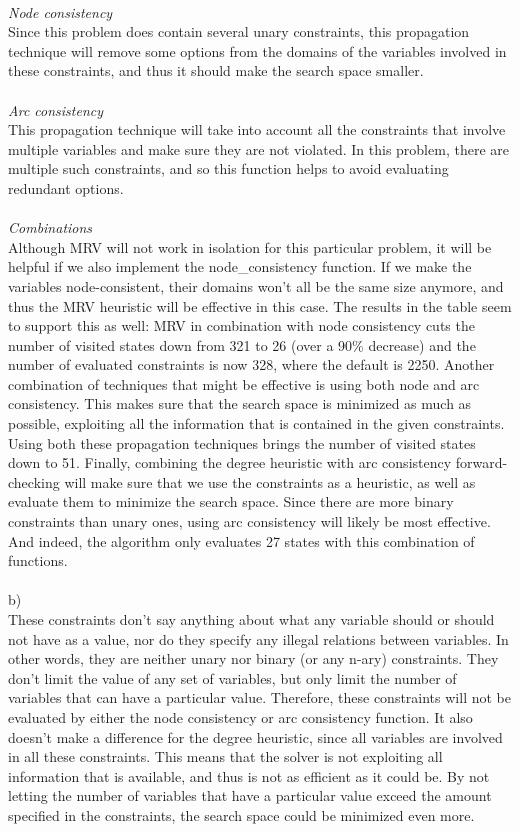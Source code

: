 \documentclass{article}
\begin{document}
\\
\textit{Node consistency}\\
Since this problem does contain several unary constraints, this propagation technique will remove some options from the domains of the variables involved in these constraints, and thus it should make the search space smaller. \\
\\
\textit{Arc consistency}\\
This propagation technique will take into account all the constraints that involve multiple variables and make sure they are not violated. In this problem, there are multiple such constraints, and so this function helps to avoid evaluating redundant options. \\
\\
\textit{Combinations}\\
Although MRV will not work in isolation for this particular problem, it will be helpful if we also implement the node\_consistency function. If we make the variables node-consistent, their domains won't all be the same size anymore, and thus the MRV heuristic will be effective in this case. The results in the table seem to support this as well: MRV in combination with node consistency cuts the number of visited states down from 321 to 26 (over a 90\% decrease) and the number of evaluated constraints is now 328, where the default is 2250. Another combination of techniques that might be effective is using both node and arc consistency. This makes sure that the search space is minimized as much as possible, exploiting all the information that is contained in the given constraints. Using both these propagation techniques brings the number of visited states down to 51. Finally, combining the degree heuristic with arc consistency forward-checking will make sure that we use the constraints as a heuristic, as well as evaluate them to minimize the search space. Since there are more binary constraints than unary ones, using arc consistency will likely be most effective. And indeed, the algorithm only evaluates 27 states with this combination of functions.\\
\\
b)
\\
These constraints don't say anything about what any variable should or should not have as a value, nor do they specify any illegal relations between variables. In other words, they are neither unary nor binary (or any n-ary) constraints. They don't limit the value of any set of variables, but only limit the number of variables that can have a particular value. Therefore, these constraints will not be evaluated by either the node consistency or arc consistency function. It also doesn't make a difference for the degree heuristic, since all variables are involved in all these constraints. This means that the solver is not exploiting all information that is available, and thus is not as efficient as it could be. By not letting the number of variables that have a particular value exceed the amount specified in the constraints, the search space could be minimized even more. 
\\
\end{document}
